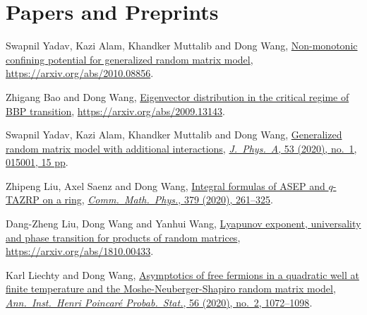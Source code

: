 

\section*{Papers and Preprints }

\begin{etaremune}
\item
  Swapnil Yadav, Kazi Alam, Khandker Muttalib and Dong Wang, \href{https://arxiv.org/abs/2010.08856}{Non-monotonic confining potential for generalized random matrix model}, \url{https://arxiv.org/abs/2010.08856}.
\item
  Zhigang Bao and Dong Wang, \href{https://arxiv.org/abs/2009.13143}{Eigenvector distribution in the critical regime of BBP transition}, \url{https://arxiv.org/abs/2009.13143}.
\item
  Swapnil Yadav, Kazi Alam, Khandker Muttalib and Dong Wang, \href{https://arxiv.org/abs/1908.03726}{Generalized random matrix model with additional interactions}, \href{https://dx.doi.org/10.1088/1751-8121/ab56e0}{\textit{J.\ Phys.\ A}, 53 (2020), no.\ 1, 015001, 15 pp}.
\item
  Zhipeng Liu, Axel Saenz and Dong Wang, \href{https://arxiv.org/abs/1905.02987}{Integral formulas of ASEP and $q$-TAZRP on a ring}, \href{https://doi.org/10.1007/s00220-020-03837-7}{\textit{Comm.\ Math.\ Phys.}, 379 (2020), 261--325}.
\item
  Dang-Zheng Liu, Dong Wang and Yanhui Wang, \href{https://arxiv.org/abs/1810.00433}{Lyapunov exponent, universality and phase transition for products of random matrices}, \url{https://arxiv.org/abs/1810.00433}.
\item
  Karl Liechty and Dong Wang, \href{https://arxiv.org/abs/1706.06653}{Asymptotics of free fermions in a quadratic well at finite temperature and the Moshe-Neuberger-Shapiro random matrix model}, \href{https://doi.org/10.1214/19-AIHP994}{\textit{Ann.\ Inst.\ Henri Poincar\'{e} Probab.\ Stat.}, 56 (2020), no.\ 2, 1072--1098}.

\end{etaremune}
